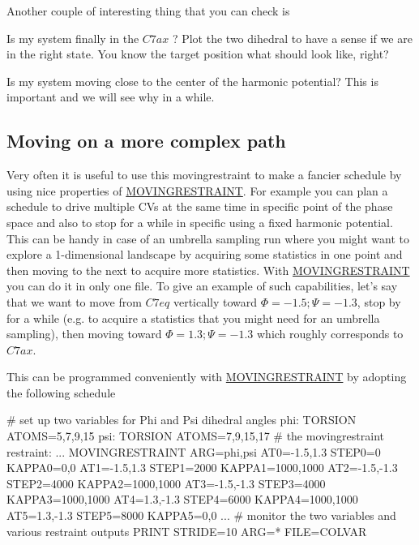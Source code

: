 Another couple of interesting thing that you can check is
\begin{DoxyItemize}
\item Is my system finally in the $ C7ax $ ? Plot the two dihedral to have a sense if we are in the right state. You know the target position what should look like, right?
\item Is my system moving close to the center of the harmonic potential? This is important and we will see why in a while.
\end{DoxyItemize}\hypertarget{belfast-5_belfast-5-path}{}\subsection{Moving on a more complex path}\label{belfast-5_belfast-5-path}
Very often it is useful to use this movingrestraint to make a fancier schedule by using nice properties of \hyperlink{MOVINGRESTRAINT}{M\+O\+V\+I\+N\+G\+R\+E\+S\+T\+R\+A\+I\+N\+T}. For example you can plan a schedule to drive multiple C\+Vs at the same time in specific point of the phase space and also to stop for a while in specific using a fixed harmonic potential. This can be handy in case of an umbrella sampling run where you might want to explore a 1-\/dimensional landscape by acquiring some statistics in one point and then moving to the next to acquire more statistics. With \hyperlink{MOVINGRESTRAINT}{M\+O\+V\+I\+N\+G\+R\+E\+S\+T\+R\+A\+I\+N\+T} you can do it in only one file. To give an example of such capabilities, let's say that we want to move from $ C7eq $ vertically toward $ \Phi =-1.5 ; \Psi=-1.3 $, stop by for a while (e.\+g. to acquire a statistics that you might need for an umbrella sampling), then moving toward $ \Phi =1.3 ; \Psi=-1.3 $ which roughly corresponds to $ C7ax $.

This can be programmed conveniently with \hyperlink{MOVINGRESTRAINT}{M\+O\+V\+I\+N\+G\+R\+E\+S\+T\+R\+A\+I\+N\+T} by adopting the following schedule

\begin{DoxyVerb}# set up two variables for Phi and Psi dihedral angles
phi: TORSION ATOMS=5,7,9,15
psi: TORSION ATOMS=7,9,15,17
# the movingrestraint
restraint: ...
        MOVINGRESTRAINT
        ARG=phi,psi
        AT0=-1.5,1.3  STEP0=0      KAPPA0=0,0
        AT1=-1.5,1.3  STEP1=2000   KAPPA1=1000,1000
        AT2=-1.5,-1.3 STEP2=4000   KAPPA2=1000,1000
        AT3=-1.5,-1.3 STEP3=4000   KAPPA3=1000,1000
        AT4=1.3,-1.3  STEP4=6000   KAPPA4=1000,1000
        AT5=1.3,-1.3  STEP5=8000   KAPPA5=0,0
...
# monitor the two variables and various restraint outputs
PRINT STRIDE=10 ARG=* FILE=COLVAR
\end{DoxyVerb}


